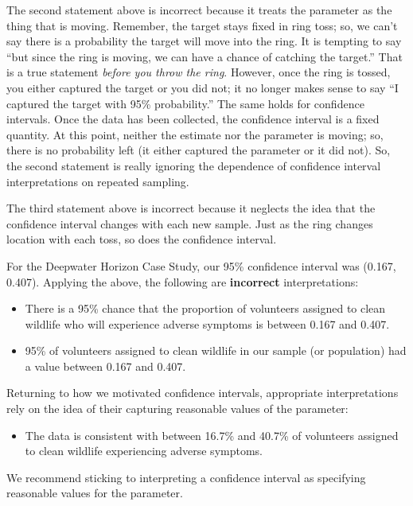 \documentclass[
  letterpaper,
  DIV=11,
  numbers=noendperiod]{scrreprt}
\providecommand{\tightlist}{%
  \setlength{\itemsep}{0pt}\setlength{\parskip}{0pt}}\usepackage{longtable,booktabs,array}
\theoremstyle{definition}
\theoremstyle{definition}
\theoremstyle{plain}
\theoremstyle{remark}
\begin{document}
The second statement above is incorrect because it treats the parameter
as the thing that is moving. Remember, the target stays fixed in ring
toss; so, we can't say there is a probability the target will move into
the ring. It is tempting to say ``but since the ring is moving, we can
have a chance of catching the target.'' That is a true statement
\emph{before you throw the ring}. However, once the ring is tossed, you
either captured the target or you did not; it no longer makes sense to
say ``I captured the target with 95\% probability.'' The same holds for
confidence intervals. Once the data has been collected, the confidence
interval is a fixed quantity. At this point, neither the estimate nor
the parameter is moving; so, there is no probability left (it either
captured the parameter or it did not). So, the second statement is
really ignoring the dependence of confidence interval interpretations on
repeated sampling.

The third statement above is incorrect because it neglects the idea that
the confidence interval changes with each new sample. Just as the ring
changes location with each toss, so does the confidence interval.

For the Deepwater Horizon Case Study, our 95\% confidence interval was
(0.167, 0.407). Applying the above, the following are \textbf{incorrect}
interpretations:

\begin{itemize}
\tightlist
\item
  There is a 95\% chance that the proportion of volunteers assigned to
  clean wildlife who will experience adverse symptoms is between 0.167
  and 0.407.
\item
  95\% of volunteers assigned to clean wildlife in our sample (or
  population) had a value between 0.167 and 0.407.
\end{itemize}

Returning to how we motivated confidence intervals, appropriate
interpretations rely on the idea of their capturing reasonable values of
the parameter:

\begin{itemize}
\tightlist
\item
  The data is consistent with between 16.7\% and 40.7\% of volunteers
  assigned to clean wildlife experiencing adverse symptoms.
\end{itemize}

We recommend sticking to interpreting a confidence interval as
specifying reasonable values for the parameter.
\end{document}
